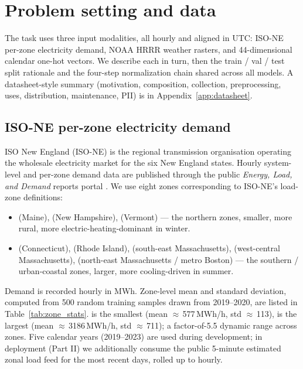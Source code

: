 
\section{Problem setting and data}
\label{sec:data}

The task uses three input modalities, all hourly and aligned in UTC: ISO-NE per-zone electricity demand, NOAA HRRR weather rasters, and 44-dimensional calendar one-hot vectors. We describe each in turn, then the train / val / test split rationale and the four-step normalization chain shared across all models. A datasheet-style summary (motivation, composition, collection, preprocessing, uses, distribution, maintenance, PII) is in Appendix~\ref{app:datasheet}.

\subsection{ISO-NE per-zone electricity demand}
\label{sec:data:demand}

ISO New England (ISO-NE) is the regional transmission organisation operating the wholesale electricity market for the six New England states. Hourly system-level and per-zone demand data are published through the public \emph{Energy, Load, and Demand} reports portal \citep{isone2024data}. We use eight zones corresponding to ISO-NE's load-zone definitions:

\begin{itemize}\setlength\itemsep{1pt}
  \item {} (Maine),  (New Hampshire),  (Vermont) --- the northern zones, smaller, more rural, more electric-heating-dominant in winter.
  \item {} (Connecticut),  (Rhode Island),  (south-east Massachusetts),  (west-central Massachusetts),  (north-east Massachusetts / metro Boston) --- the southern / urban-coastal zones, larger, more cooling-driven in summer.
\end{itemize}

Demand is recorded hourly in MWh. Zone-level mean and standard deviation, computed from 500 random training samples drawn from 2019--2020, are listed in Table~\ref{tab:zone_stats}.  is the smallest (mean $\approx$\,577\,MWh/h, std $\approx$\,113),  is the largest (mean $\approx$\,3186\,MWh/h, std $\approx$\,711); a factor-of-5.5 dynamic range across zones. Five calendar years (2019--2023) are used during development; in deployment (Part II) we additionally consume the public 5-minute estimated zonal load feed for the most recent days, rolled up to hourly.

